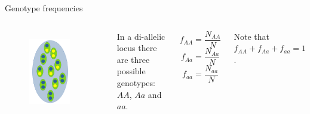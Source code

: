 \begin{frame}{Genotype frequencies}

        \begin{columns}


                \begin{figure}
                        \includegraphics[width=0.8\textwidth]{Pics/population} \
                \end{figure}


		\small
		In a di-allelic locus there are three possible genotypes: $AA$, $Aa$ and $aa$.

                \begin{equation}
                        f_{AA} = \frac{N_{AA}}{N}
                \end{equation}
                \begin{equation}
                        f_{Aa} = \frac{N_{Aa}}{N}
                \end{equation}
		\begin{equation}
                        f_{aa} = \frac{N_{aa}}{N}
                \end{equation}

                \bigskip

                Note that $f_{AA} + f_{Aa} + f_{aa} = 1$.

        \end{columns}

\end{frame}

